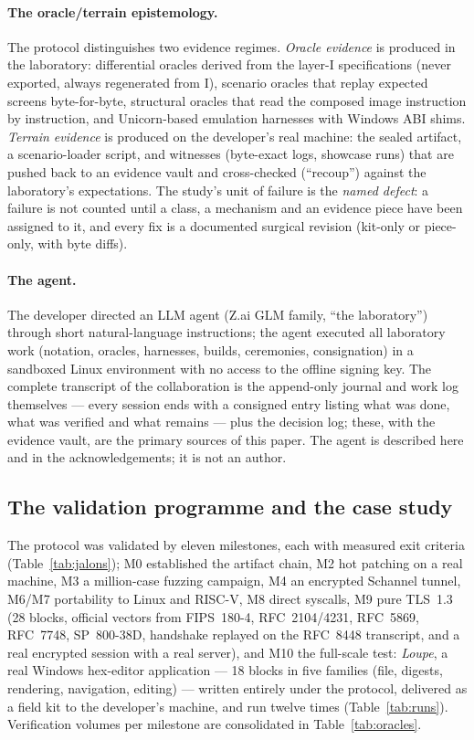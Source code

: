 \documentclass[10pt,a4paper]{article}
\begin{document}
\paragraph{The oracle/terrain epistemology.}
The protocol distinguishes two evidence regimes. \emph{Oracle evidence} is
produced in the laboratory: differential oracles derived from the layer-I
specifications (never exported, always regenerated from I), scenario
oracles that replay expected screens byte-for-byte, structural oracles
that read the composed image instruction by instruction, and Unicorn-based
emulation harnesses with Windows ABI shims. \emph{Terrain evidence} is
produced on the developer's real machine: the sealed artifact, a
scenario-loader script, and witnesses (byte-exact logs, showcase runs)
that are pushed back to an evidence vault and cross-checked (``recoup'')
against the laboratory's expectations. The study's unit of failure is the
\emph{named defect}: a failure is not counted until a class, a mechanism
and an evidence piece have been assigned to it, and every fix is a
documented surgical revision (kit-only or piece-only, with byte diffs).

\paragraph{The agent.}
The developer directed an LLM agent (Z.ai GLM family, ``the laboratory'')
through short natural-language instructions; the agent executed all
laboratory work (notation, oracles, harnesses, builds, ceremonies,
consignation) in a sandboxed Linux environment with no access to the
offline signing key. The complete transcript of the collaboration is the
append-only journal and work log themselves --- every session ends with a
consigned entry listing what was done, what was verified and what remains
--- plus the decision log; these, with the evidence vault, are the
primary sources of this paper. The agent is described here and in the
acknowledgements; it is not an author.

\subsection{The validation programme and the case study}\label{sec:cas}

The protocol was validated by eleven milestones, each with measured exit
criteria (Table~\ref{tab:jalons}); M0 established the artifact chain,
M2 hot patching on a real machine, M3 a million-case fuzzing campaign,
M4 an encrypted Schannel tunnel, M6/M7 portability to Linux and RISC-V,
M8 direct syscalls, M9 pure TLS~1.3 (28 blocks, official vectors from
FIPS~180-4, RFC~2104/4231, RFC~5869, RFC~7748, SP~800-38D, handshake
replayed on the RFC~8448 transcript, and a real encrypted session with a
real server), and M10 the full-scale test: \emph{Loupe}, a real Windows
hex-editor application --- 18 blocks in five families (file, digests,
rendering, navigation, editing) --- written entirely under the protocol,
delivered as a field kit to the developer's machine, and run twelve times
(Table~\ref{tab:runs}). Verification volumes per milestone are
consolidated in Table~\ref{tab:oracles}.
\end{document}
